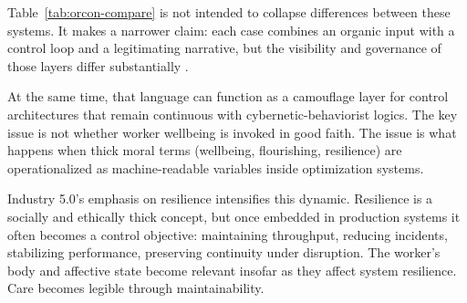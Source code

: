 \documentclass[runningheads]{llncs}
\begin{document}
\begin{table}
\caption{Comparative ORCON architectures across military, platform, and workplace settings}\label{tab:orcon-compare}
\centering
\small
{}
\end{table}

Table~\ref{tab:orcon-compare} is not intended to collapse differences between these systems. It makes a narrower claim: each case combines an organic input with a control loop and a legitimating narrative, but the visibility and governance of those layers differ substantially \cite{skinner1960pigeons,gray2019ghost,breque2021industry}.

At the same time, that language can function as a camouflage layer for control architectures that remain continuous with cybernetic-behaviorist logics. The key issue is not whether worker wellbeing is invoked in good faith. The issue is what happens when thick moral terms (wellbeing, flourishing, resilience) are operationalized as machine-readable variables inside optimization systems.

Industry 5.0's emphasis on resilience intensifies this dynamic. Resilience is a socially and ethically thick concept, but once embedded in production systems it often becomes a control objective: maintaining throughput, reducing incidents, stabilizing performance, preserving continuity under disruption. The worker's body and affective state become relevant insofar as they affect system resilience. Care becomes legible through maintainability.
\end{document}
